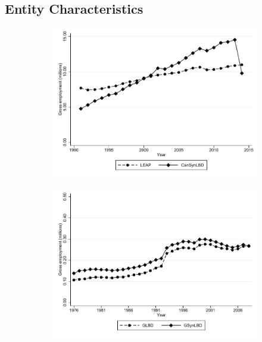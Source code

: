 
\newcommand{\CanTableNote}{$LEAP$ is the Longitudinal Employment Analysis Program and $CanSynLBD$ is the Canadian synthetic database based on LEAP. }

\subsection{Entity Characteristics}

\begin{figure}[t]
\begin{subfigure}[h]{0.48\linewidth}
\includegraphics[trim=0 40 0 0,clip, width=\linewidth]{graphs/Gross_employment_level_by_year_private_bw.pdf}
\end{subfigure}
\hfill
\begin{subfigure}[h]{0.48\linewidth}
\includegraphics[trim=0 40 0 0,clip,width=\linewidth]{graphs/Gross_employment_level_by_year_bw_GsynLBD.pdf}

\end{subfigure}
\end{figure}
